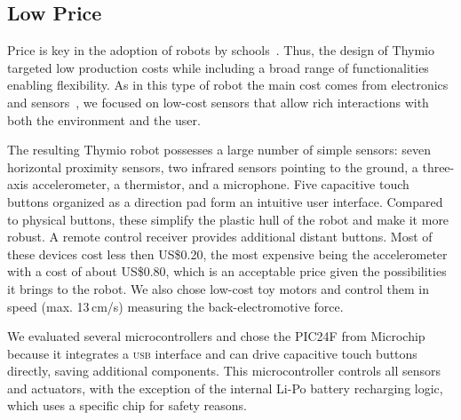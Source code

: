\documentclass[letterpaper, 10 pt, conference]{ieeeconf}  %
\begin{document}
\subsection{Low Price}

Price is key in the adoption of robots by schools~\cite{kradolfer2014sociological}.
Thus, the design of Thymio targeted low production costs while including a broad range of functionalities enabling flexibility.
As in this type of robot the main cost comes from electronics and sensors~\cite{thesis_michael}, we focused on low-cost sensors that allow rich interactions with both the environment and the user.

The resulting Thymio robot possesses a large number of simple sensors:
seven horizontal proximity sensors, two infrared sensors pointing to the ground, a three-axis accelerometer, a thermistor, and a microphone.
Five capacitive touch buttons organized as a direction pad form an intuitive user interface.
Compared to physical buttons, these simplify the plastic hull of the robot and make it more robust.
A remote control receiver provides additional distant buttons.
Most of these devices cost less then US\$0.20, the most expensive being the accelerometer with a cost of about US\$0.80, which is an acceptable price given the possibilities it brings to the robot.
We also chose low-cost toy motors and control them in speed (max. 13\,cm/s) measuring the back-electromotive force.

We evaluated several microcontrollers and chose the PIC24F from Microchip because it integrates a \textsc{usb} interface and can drive capacitive touch buttons directly, saving additional components. 
This microcontroller controls all sensors and actuators, with the exception of the internal Li-Po battery recharging logic, which uses a specific chip for safety reasons.
\end{document}
